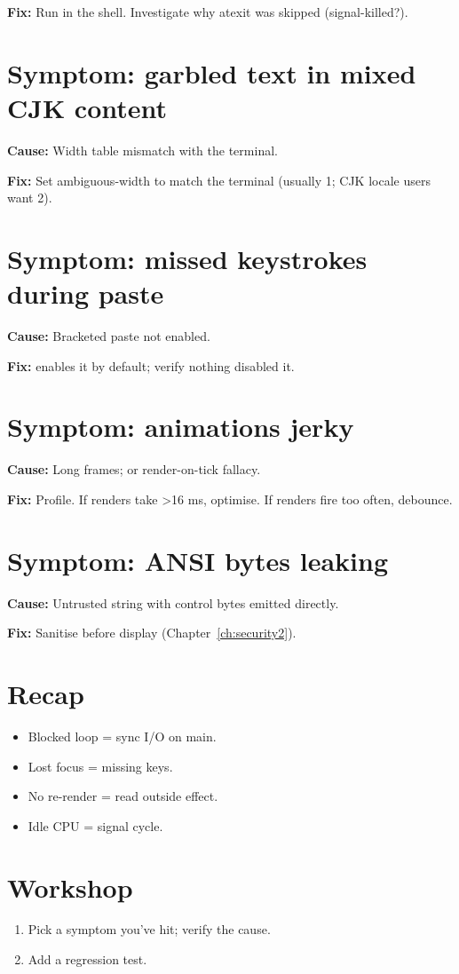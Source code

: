 \textbf{Fix:} Run  in the shell. Investigate
why atexit was skipped (signal-killed?).

\section{Symptom: garbled text in mixed CJK content}

\textbf{Cause:} Width table mismatch with the terminal.

\textbf{Fix:} Set ambiguous-width to match the terminal
(usually 1; CJK locale users want 2).

\section{Symptom: missed keystrokes during paste}

\textbf{Cause:} Bracketed paste not enabled.

\textbf{Fix:} \maya{} enables it by default; verify
nothing disabled it.

\section{Symptom: animations jerky}

\textbf{Cause:} Long frames; or render-on-tick fallacy.

\textbf{Fix:} Profile. If renders take >16 ms, optimise.
If renders fire too often, debounce.

\section{Symptom: ANSI bytes leaking}

\textbf{Cause:} Untrusted string with control bytes
emitted directly.

\textbf{Fix:} Sanitise before display
(Chapter~\ref{ch:security2}).

\section{Recap}

\begin{recap}
\begin{itemize}[leftmargin=*]
  \item Blocked loop = sync I/O on main.
  \item Lost focus = missing keys.
  \item No re-render = read outside effect.
  \item Idle CPU = signal cycle.
\end{itemize}
\end{recap}

\section*{Workshop}

\begin{enumerate}[leftmargin=*]
  \item Pick a symptom you've hit; verify the cause.
  \item Add a regression test.
\end{enumerate}

